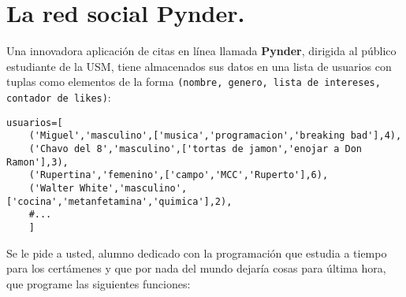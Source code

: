 \section{La red social Pynder. }
Una innovadora aplicación de citas en línea llamada \textbf{Pynder}, dirigida al público estudiante de la USM, tiene almacenados sus datos en una lista de usuarios con tuplas como elementos de la forma \texttt{(nombre, genero, lista de intereses, contador de likes)}:

\begin{lstlisting}[style=consola]
usuarios=[
    ('Miguel','masculino',['musica','programacion','breaking bad'],4),
    ('Chavo del 8','masculino',['tortas de jamon','enojar a Don Ramon'],3),
    ('Rupertina','femenino',['campo','MCC','Ruperto'],6),
    ('Walter White','masculino',['cocina','metanfetamina','quimica'],2),
    #...
    ]
\end{lstlisting}

Se le pide a usted, alumno dedicado con la programación que estudia a tiempo para los certámenes y que por nada del mundo dejaría cosas para última hora, que programe las siguientes funciones:

